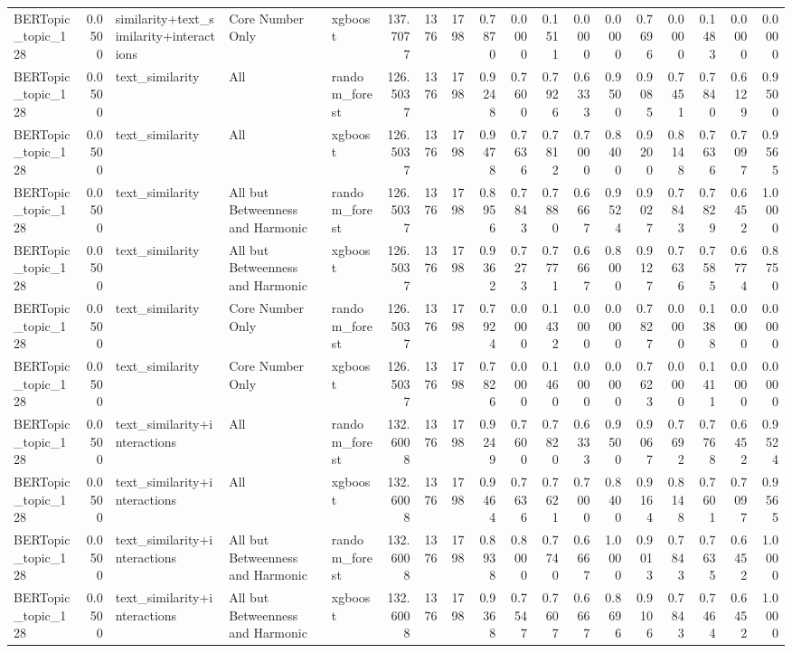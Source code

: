 \begin{tabular}{lrlllrrrrrrrrrrrrr}
BERTopic_topic_128 & 0.0500 & similarity+text_similarity+interactions & Core Number Only & xgboost & 137.7077 & 1376 & 1798 & 0.7870 & 0.0000 & 0.1511 & 0.0000 & 0.0000 & 0.7696 & 0.0000 & 0.1483 & 0.0000 & 0.0000 \\
BERTopic_topic_128 & 0.0500 & text_similarity & All & random_forest & 126.5037 & 1376 & 1798 & 0.9248 & 0.7600 & 0.7926 & 0.6333 & 0.9500 & 0.9085 & 0.7451 & 0.7840 & 0.6129 & 0.9500 \\
BERTopic_topic_128 & 0.0500 & text_similarity & All & xgboost & 126.5037 & 1376 & 1798 & 0.9478 & 0.7636 & 0.7812 & 0.7000 & 0.8400 & 0.9200 & 0.8148 & 0.7636 & 0.7097 & 0.9565 \\
BERTopic_topic_128 & 0.0500 & text_similarity & All but Betweenness and Harmonic & random_forest & 126.5037 & 1376 & 1798 & 0.8956 & 0.7843 & 0.7880 & 0.6667 & 0.9524 & 0.9027 & 0.7843 & 0.7829 & 0.6452 & 1.0000 \\
BERTopic_topic_128 & 0.0500 & text_similarity & All but Betweenness and Harmonic & xgboost & 126.5037 & 1376 & 1798 & 0.9362 & 0.7273 & 0.7771 & 0.6667 & 0.8000 & 0.9127 & 0.7636 & 0.7585 & 0.6774 & 0.8750 \\
BERTopic_topic_128 & 0.0500 & text_similarity & Core Number Only & random_forest & 126.5037 & 1376 & 1798 & 0.7924 & 0.0000 & 0.1432 & 0.0000 & 0.0000 & 0.7827 & 0.0000 & 0.1388 & 0.0000 & 0.0000 \\
BERTopic_topic_128 & 0.0500 & text_similarity & Core Number Only & xgboost & 126.5037 & 1376 & 1798 & 0.7826 & 0.0000 & 0.1460 & 0.0000 & 0.0000 & 0.7623 & 0.0000 & 0.1411 & 0.0000 & 0.0000 \\
BERTopic_topic_128 & 0.0500 & text_similarity+interactions & All & random_forest & 132.6008 & 1376 & 1798 & 0.9249 & 0.7600 & 0.7820 & 0.6333 & 0.9500 & 0.9067 & 0.7692 & 0.7768 & 0.6452 & 0.9524 \\
BERTopic_topic_128 & 0.0500 & text_similarity+interactions & All & xgboost & 132.6008 & 1376 & 1798 & 0.9464 & 0.7636 & 0.7621 & 0.7000 & 0.8400 & 0.9164 & 0.8148 & 0.7601 & 0.7097 & 0.9565 \\
BERTopic_topic_128 & 0.0500 & text_similarity+interactions & All but Betweenness and Harmonic & random_forest & 132.6008 & 1376 & 1798 & 0.8938 & 0.8000 & 0.7740 & 0.6667 & 1.0000 & 0.9013 & 0.7843 & 0.7635 & 0.6452 & 1.0000 \\
BERTopic_topic_128 & 0.0500 & text_similarity+interactions & All but Betweenness and Harmonic & xgboost & 132.6008 & 1376 & 1798 & 0.9368 & 0.7547 & 0.7607 & 0.6667 & 0.8696 & 0.9106 & 0.7843 & 0.7464 & 0.6452 & 1.0000 \\

\end{tabular}
